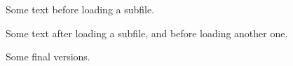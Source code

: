 \documentclass{article}
\begin{document}
Some text before loading a subfile.



Some text after loading a subfile, and before loading another one.



Some final versions.
\end{document}
